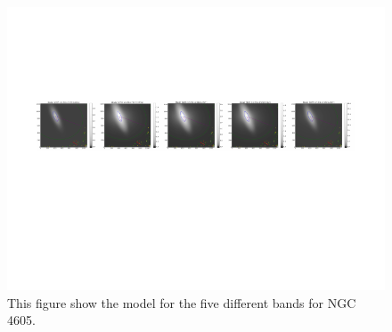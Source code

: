 \documentclass[12pt,preprint,pdftex]{aastex}
\begin{document}
\begin{figure}
\centering
\includegraphics[trim = .9cm 4.5cm 0cm 2.9cm,clip=true,width=\textwidth] {goodsingle-colors-model.pdf}
\caption{This figure show the model for the five different bands for NGC 4605.}
\label{fig:colorsmodel}
\end{figure}
\end{document}
